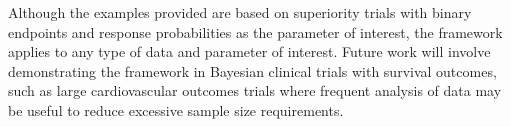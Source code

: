 \documentclass[AMA,STIX1COL,doublespace]{WileyNJD-v2}
\begin{document}
Although the examples provided are based on superiority trials with binary endpoints and response probabilities as the parameter of interest, the framework applies to any type of data and parameter of interest.
%
Future work will involve demonstrating the framework in Bayesian clinical trials with survival outcomes, such as large cardiovascular outcomes trials where frequent analysis of data may be useful to reduce excessive sample size requirements.



%
%
%
%
%
%
%
%
%
%
%
\end{document}

